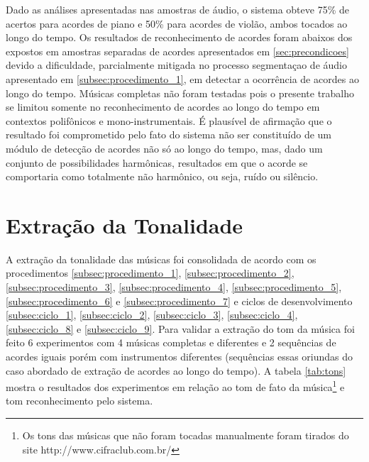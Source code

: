 Dado as análises apresentadas nas amostras de áudio, o sistema obteve 75\% de acertos para acordes de piano e 50\% para acordes de violão, ambos tocados ao longo do tempo. Os resultados de reconhecimento de acordes foram abaixos dos expostos em amostras separadas de acordes apresentados em \ref{sec:precondicoes} devido a dificuldade, parcialmente mitigada no processo segmentaçao de áudio apresentado em \ref{subsec:procedimento_1}, em detectar a ocorrência de acordes ao longo do tempo. Músicas completas não foram testadas pois o presente trabalho se limitou somente no reconhecimento de acordes ao longo do tempo em contextos polifônicos e mono-instrumentais. É plausível de afirmação que o resultado foi comprometido pelo fato do sistema não ser constituído de um módulo de detecção de acordes não só ao longo do tempo, mas, dado um conjunto de possibilidades harmônicas, resultados em que o acorde se comportaria como totalmente não harmônico, ou seja, ruído ou silêncio.

\section{Extração da Tonalidade}
\label{sec:tom}

A extração da tonalidade das músicas foi consolidada de acordo com os procedimentos \ref{subsec:procedimento_1}, \ref{subsec:procedimento_2}, \ref{subsec:procedimento_3}, \ref{subsec:procedimento_4}, \ref{subsec:procedimento_5}, \ref{subsec:procedimento_6} e \ref{subsec:procedimento_7} e ciclos de desenvolvimento \ref{subsec:ciclo_1}, \ref{subsec:ciclo_2}, \ref{subsec:ciclo_3}, \ref{subsec:ciclo_4}, \ref{subsec:ciclo_8} e \ref{subsec:ciclo_9}. Para validar a extração do tom da música foi feito 6 experimentos com 4 músicas completas e diferentes e 2 sequências de acordes iguais porém com instrumentos diferentes (sequências essas oriundas do caso abordado de extração de acordes ao longo do tempo). A tabela \ref{tab:tons} mostra o resultados dos experimentos em relação ao tom de fato da música\footnote{Os tons das músicas que não foram tocadas manualmente foram tirados do site http://www.cifraclub.com.br/} e tom reconhecimento pelo sistema.

